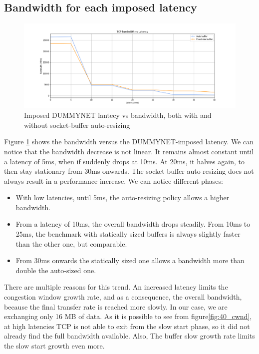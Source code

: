 \documentclass[a4paper,10pt]{article}
\begin{document}
\subsection{Bandwidth for each imposed latency}

\begin{figure}[h]
\centering
\includegraphics[width=\textwidth]{images/tcp_bandwidth.png}
  \caption{Imposed DUMMYNET lantecy vs bandwidth, both with and without socket-buffer auto-resizing}
   \label{fig:bandwidth}
\end{figure}

Figure \ref{fig:bandwidth} shows the bandwidth versus the DUMMYNET-imposed latency. We can notice that the bandwidth decrease is not linear. It remains almost constant until a latency of 5ms, when if suddenly drops at 10ms. At 20ms, it halves again, to then stay stationary from 30ms onwards.
The socket-buffer auto-resizing does not always result in a performance increase. We can notice different phases:
\begin{itemize}
   \item With low latencies, until 5ms, the auto-resizing policy allows a higher bandwidth. %

   \item From a latency of 10ms, the overall bandwidth drops steadily. From 10ms to 25ms, the benchmark with statically sized buffers is always slightly faster than the other one, but comparable.
   \item From 30ms onwards the statically sized one allows a bandwidth more than double the auto-sized one. %
\end{itemize}

There are multiple reasons for this trend. 
An increased latency limits the congestion window growth rate, and as a consequence, the overall bandwidth, because the final transfer rate is reached more slowly. In our case, we are exchanging only 16 MB of data. As it is possible to see from figure\ref{fig:40_cwnd}, at high latencies TCP is not able to exit from the slow start phase, so it did not already find the full bandwidth available.
Also, The buffer slow growth rate limits the slow start growth even more.
\end{document}
